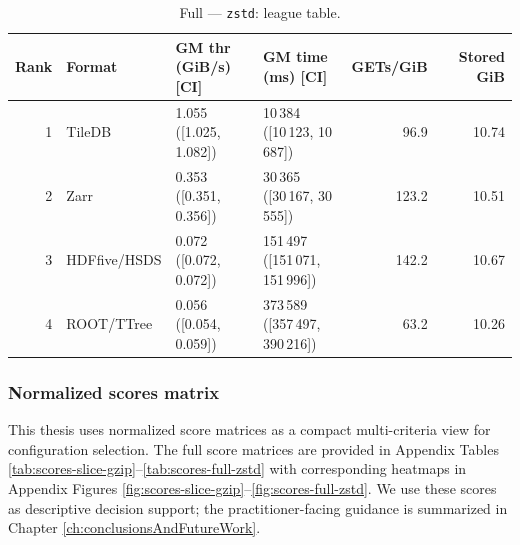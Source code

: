 \documentclass[nomenclature, english, bibtex]{kththesis}
\numberwithin{listing}{chapter}
\begin{document}
\begin{table}[H]
  \centering
  \small
  \setlength{\tabcolsep}{4pt}
  \caption{Full --- \texttt{zstd}: league table.}
  \label{tab:league-full-zstd}
  \begin{tabular}{@{}r l
                  >{\raggedleft\arraybackslash}p{2.7cm}
                  >{\raggedleft\arraybackslash}p{3.0cm}
                  r r@{}}
    \toprule
    Rank & Format &
    \makecell[r]{\gls{GM} thr\\(GiB/s) [\gls{CI}]} &
    \makecell[r]{\gls{GM} time\\(ms) [\gls{CI}]} &
    GETs/GiB & Stored GiB \\
    \midrule
    1 & TileDB &
    \makecell[rt]{1.055\\\footnotesize([1.025, 1.082])} &
    \makecell[rt]{10\,384\\\footnotesize([10\,123, 10\,687])} &
    96.9 & 10.74 \\

    2 & Zarr &
    \makecell[rt]{0.353\\\footnotesize([0.351, 0.356])} &
    \makecell[rt]{30\,365\\\footnotesize([30\,167, 30\,555])} &
    123.2 & 10.51 \\

    3 & \gls{HDFfive}/\gls{HSDS} &
    \makecell[rt]{0.072\\\footnotesize([0.072, 0.072])} &
    \makecell[rt]{151\,497\\\footnotesize([151\,071, 151\,996])} &
    142.2 & 10.67 \\

    4 & \gls{ROOT}/\gls{TTree} &
    \makecell[rt]{0.056\\\footnotesize([0.054, 0.059])} &
    \makecell[rt]{373\,589\\\footnotesize([357\,497, 390\,216])} &
    63.2 & 10.26 \\
    \bottomrule
  \end{tabular}
\end{table}


\subsubsection{Normalized scores matrix}
This thesis uses normalized score matrices as a compact multi-criteria view for configuration selection. The full score matrices are provided in Appendix Tables \ref{tab:scores-slice-gzip}–\ref{tab:scores-full-zstd} with corresponding heatmaps in Appendix Figures \ref{fig:scores-slice-gzip}–\ref{fig:scores-full-zstd}. We use these scores as descriptive decision support; the practitioner-facing guidance is summarized in Chapter \ref{ch:conclusionsAndFutureWork}.
\end{document}
